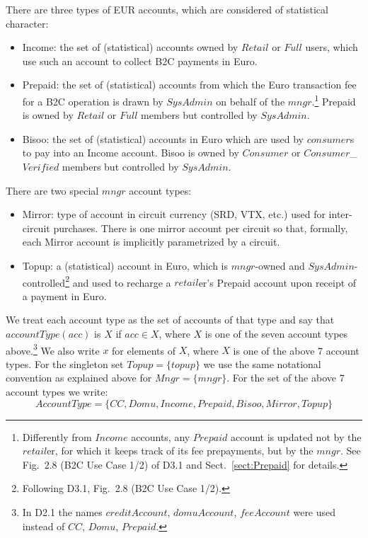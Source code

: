 There are three types of EUR accounts, which are considered of statistical character:
\begin{itemize}
	\item  Income: the set of (statistical) accounts owned by $Retail$ or $Full$ users, which use such an account to collect B2C payments in Euro.
	
	\item Prepaid: the set of (statistical) accounts from which the Euro transaction fee for a B2C operation is drawn by $SysAdmin$ on behalf of the $mngr$.\footnote{Differently from $Income$ accounts, any $Prepaid$ account is updated not by the $retail$er, for which it keeps track of its fee prepayments, but by the $mngr$. See Fig.\ 2.8 (B2C Use Case 1/2) of D3.1 and Sect.~\ref{sect:Prepaid} for details.} 
	Prepaid is owned by $Retail$ or $Full$ members but controlled by $SysAdmin$.
	
	\item Bisoo: the set of (statistical) accounts in Euro which are used by $consumer$s to pay into an Income account. Bisoo is owned by $Consumer$ or $Consumer$\_$Verified$ members but controlled by $SysAdmin$.
\end{itemize}

There are two special $mngr$ account types:
\begin{itemize}
	\item Mirror: type of account in circuit currency (SRD, VTX, etc.) used for inter-circuit purchases. There is one mirror account per circuit so that, formally, each Mirror account is implicitly parametrized by a circuit.	
	\item Topup: a (statistical) account in Euro, which is $mngr$-owned and $SysAdmin$-controlled\footnote{Following D3.1, Fig.\ 2.8 (B2C Use Case 1/2).}  and used to recharge a $retail$er's Prepaid account upon receipt of a payment in Euro.
\end{itemize}

We treat each account type as the set of accounts of that type and say that $accountType(acc)$ is $X$ if $acc \in X$, where $X$ is one of the seven account types above.\footnote{In D2.1 the names $creditAccount$, $domuAccount$, $feeAccount$ were used instead of $CC$, $Domu$, $Prepaid$.} We also write $x$ for elements of $X$, where $X$ is one of the above 7 account types. For the singleton set $Topup=\{topup\}$ we use the same notational convention as explained above for $Mngr=\{mngr\}$. For the set of the above 7 account types we write:
\[AccountType=\{CC,Domu,Income,Prepaid,Bisoo,Mirror,Topup\} \]

